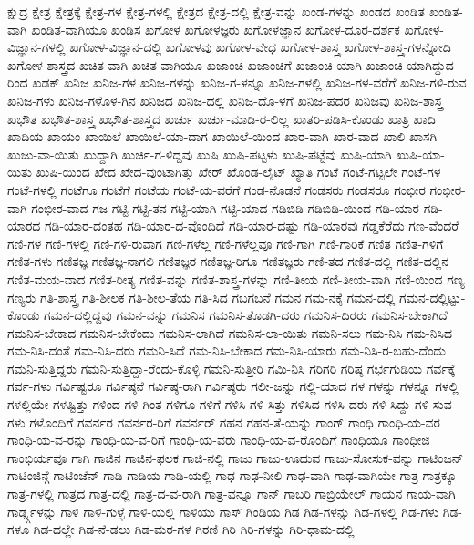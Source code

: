 {ಕ್ಷುದ್ರ
ಕ್ಷೇತ್ರ
ಕ್ಷೇತ್ರಕ್ಕೆ
ಕ್ಷೇತ್ರ-ಗಳ
ಕ್ಷೇತ್ರ-ಗಳಲ್ಲಿ
ಕ್ಷೇತ್ರದ
ಕ್ಷೇತ್ರ-ದಲ್ಲಿ
ಕ್ಷೇತ್ರ-ವನ್ನು
ಖಂಡ-ಗಳನ್ನು
ಖಂಡದ
ಖಂಡಿತ
ಖಂಡಿತ-ವಾಗಿ
ಖಂಡಿತ-ವಾಗಿಯೂ
ಖಂಡಿಸ
ಖಗೋಳ
ಖಗೋಳಜ್ಞರು
ಖಗೋಳಜ್ಞಾನ
ಖಗೋಳ-ದೂರ-ದರ್ಶಕ
ಖಗೋಳ-ವಿಜ್ಞಾನ-ಗಳಲ್ಲಿ
ಖಗೋಳ-ವಿಜ್ಞಾನ-ದಲ್ಲಿ
ಖಗೋಳವು
ಖಗೋಳ-ವೇಧ
ಖಗೋಳ-ಶಾಸ್ತ್ರ
ಖಗೋಳ-ಶಾಸ್ತ್ರ-ಗಳನ್ನೋದಿ
ಖಗೋಳ-ಶಾಸ್ತ್ರದ
ಖಚಿತ-ವಾಗಿ
ಖಚಿತ-ವಾಗಿಯೂ
ಖಜಾಂಚಿ
ಖಜಾಂಚಿಗೆ
ಖಜಾಂಚಿ-ಯಾಗಿ
ಖಜಾಂಚಿ-ಯಾಗಿದ್ದುದ-ರಿಂದ
ಖಡಕ್
ಖನಿಜ
ಖನಿಜ-ಗಳ
ಖನಿಜ-ಗಳನ್ನು
ಖನಿಜ-ಗ-ಳನ್ನೂ
ಖನಿಜ-ಗಳಲ್ಲಿ
ಖನಿಜ-ಗಳ-ವರೆಗೆ
ಖನಿಜ-ಗಳಿ-ರುವ
ಖನಿಜ-ಗಳು
ಖನಿಜ-ಗಳೊಳ-ಗಿನ
ಖನಿಜದ
ಖನಿಜ-ದಲ್ಲಿ
ಖನಿಜ-ದೊ-ಳಗೆ
ಖನಿಜ-ಪದರ
ಖನಿಜವು
ಖನಿಜ-ಶಾಸ್ತ್ರ
ಖಭೌತ
ಖಭೌತ-ಶಾಸ್ತ್ರ
ಖಭೌತ-ಶಾಸ್ತ್ರದ
ಖರ್ಚು
ಖರ್ಚು-ಮಾಡಿ-ರ-ಲಿಲ್ಲ
ಖಾತರಿ-ಪಡಿಸಿ-ಕೊಂಡು
ಖಾತ್ರಿ
ಖಾದಿ
ಖಾದಿಯ
ಖಾಯಂ
ಖಾಯಿಲೆ
ಖಾಯಿಲೆ-ಯಾ-ದಾಗ
ಖಾಯಿಲೆ-ಯಿಂದ
ಖಾರ-ವಾಗಿ
ಖಾರ-ವಾದ
ಖಾಲಿ
ಖಾಸಗಿ
ಖುಜು-ವಾ-ಯಿತು
ಖುದ್ದಾಗಿ
ಖುರ್ಚಿ-ಗ-ಳಿದ್ದವು
ಖುಷಿ
ಖುಷಿ-ಪಟ್ಟಳು
ಖುಷಿ-ಪಟ್ಟೆವು
ಖುಷಿ-ಯಾಗಿ
ಖುಷಿ-ಯಾ-ಯಿತು
ಖುಷಿ-ಯಿಂದ
ಖೇದ
ಖೇದ-ವುಂಟಾಗಿತ್ತು
ಖೇರ್
ಖೊಂಡ-ಲೈಟ್
ಖ್ಯಾತಿ
ಗಂಟೆ
ಗಂಟೆ-ಗಟ್ಟಲೇ
ಗಂಟೆ-ಗಳ
ಗಂಟೆ-ಗಳಲ್ಲಿ
ಗಂಟೆಗೂ
ಗಂಟೆಗೆ
ಗಂಟೆಯ
ಗಂಟೆ-ಯ-ವರೆಗೆ
ಗಂಡ-ನೊಡನೆ
ಗಂಡಸರು
ಗಂಡಸರೂ
ಗಂಭೀರ
ಗಂಭೀರ-ವಾಗಿ
ಗಂಭೀರ-ವಾದ
ಗಜ
ಗಟ್ಟಿ
ಗಟ್ಟಿ-ತನ
ಗಟ್ಟಿ-ಯಾಗಿ
ಗಟ್ಟಿ-ಯಾದ
ಗಡಿಬಿಡಿ
ಗಡಿಬಿಡಿ-ಯಿಂದ
ಗಡಿ-ಯಾರ
ಗಡಿ-ಯಾರದ
ಗಡಿ-ಯಾರ-ದಂತಹ
ಗಡಿ-ಯಾರ-ದ-ವೊಂದಿದೆ
ಗಡಿ-ಯಾರ-ದಷ್ಟು
ಗಡಿ-ಯಾರವು
ಗಡ್ಡಕೆರೆದು
ಗಣ-ವೆಂದರೆ
ಗಣಿ-ಗಳ
ಗಣಿ-ಗಳಲ್ಲಿ
ಗಣಿ-ಗಳಿ-ರುವಾಗ
ಗಣಿ-ಗಳೆಲ್ಲ
ಗಣಿ-ಗಳೆಲ್ಲವೂ
ಗಣಿ-ಗಾಗಿ
ಗಣಿ-ಗಾರಿಕೆ
ಗಣಿತ
ಗಣಿತ-ಗಳಿಗೆ
ಗಣಿತ-ಗಳು
ಗಣಿತಜ್ಞ
ಗಣಿತಜ್ಞ-ನಾಗಲಿ
ಗಣಿತಜ್ಞರ
ಗಣಿತಜ್ಞ-ರಿಗೂ
ಗಣಿತಜ್ಞರು
ಗಣಿ-ತದ
ಗಣಿತ-ದಲ್ಲಿ
ಗಣಿತ-ದಲ್ಲಿನ
ಗಣಿತ-ಮಯ-ವಾದ
ಗಣಿತ-ರೀತ್ಯ
ಗಣಿತ-ವನ್ನು
ಗಣಿತ-ಶಾಸ್ತ್ರ-ಗಳನ್ನು
ಗಣಿ-ತೀಯ
ಗಣಿ-ತೀಯ-ವಾಗಿ
ಗಣಿ-ಯಿಂದ
ಗಣ್ಯ
ಗಣ್ಯರು
ಗತಿ-ಶಾಸ್ತ್ರ
ಗತಿ-ಶೀಲಕ
ಗತಿ-ಶೀಲ-ತೆಯ
ಗತಿ-ಸಿದ
ಗಬಗಬನೆ
ಗಮನ
ಗಮ-ನಕ್ಕೆ
ಗಮನ-ದಲ್ಲಿ
ಗಮನ-ದಲ್ಲಿಟ್ಟು-ಕೊಂಡು
ಗಮನ-ದಲ್ಲಿದ್ದವು
ಗಮನ-ವನ್ನು
ಗಮನಿಸ
ಗಮನಿಸ-ತೊಡಗಿ-ದರು
ಗಮನಿಸ-ದಿರರು
ಗಮನಿಸ-ಬೇಕಾಗಿದೆ
ಗಮನಿಸ-ಬೇಕಾದ
ಗಮನಿಸ-ಬೇಕೆಂದು
ಗಮನಿಸ-ಲಾಗಿದೆ
ಗಮನಿಸ-ಲಾ-ಯಿತು
ಗಮನಿ-ಸಲು
ಗಮ-ನಿಸಿ
ಗಮ-ನಿಸಿದ
ಗಮ-ನಿಸಿ-ದಂತೆ
ಗಮ-ನಿಸಿ-ದರು
ಗಮನಿ-ಸಿದೆ
ಗಮ-ನಿಸಿ-ಬೇಕಾದ
ಗಮ-ನಿಸಿ-ಯಾರು
ಗಮ-ನಿಸಿ-ರ-ಬಹು-ದೆಂದು
ಗಮನಿ-ಸುತ್ತಿದ್ದರು
ಗಮನಿ-ಸುತ್ತಿದ್ದಾ-ರೆಂದು-ಕೊಳ್ಳಿ
ಗಮನಿ-ಸುತ್ತೀರಿ
ಗಮಿ-ನಿಸಿ
ಗರಿಗರಿ
ಗರಿಷ್ಠ
ಗರ್ಭಗುಡಿಯ
ಗರ್ವಕ್ಕೆ
ಗರ್ವ-ಗಳು
ಗರ್ವಿಷ್ಟರೂ
ಗರ್ವಿಷ್ಠನೆ
ಗರ್ವಿಷ್ಠ-ರಾಗಿ
ಗರ್ವಿಷ್ಠರು
ಗಲೀ-ಜನ್ನು
ಗಲ್ಲಿ-ಯಾದ
ಗಳ
ಗಳನ್ನು
ಗಳನ್ನೂ
ಗಳಲ್ಲಿ
ಗಳಲ್ಲಿಯೇ
ಗಳಷ್ಟಿತ್ತು
ಗಳಿಂದ
ಗಳಿ-ಗಿಂತ
ಗಳಿಗೂ
ಗಳಿಗೆ
ಗಳಿಸಿ
ಗಳಿ-ಸಿತ್ತು
ಗಳಿಸಿದ
ಗಳಿಸಿ-ದರು
ಗಳಿ-ಸಿದ್ದು
ಗಳಿ-ಸುವ
ಗಳು
ಗಳೊಂದಿಗೆ
ಗವರ್ನರ
ಗವರ್ನರ-ರಿಗೆ
ಗವರ್ನರ್
ಗಹನ
ಗಹನ-ತೆ-ಯನ್ನು
ಗಾಂಗ್
ಗಾಂಧಿ
ಗಾಂಧಿ-ಯ-ವರ
ಗಾಂಧಿ-ಯ-ವ-ರನ್ನು
ಗಾಂಧಿ-ಯ-ವ-ರಿಗೆ
ಗಾಂಧಿ-ಯ-ವರು
ಗಾಂಧಿ-ಯ-ವ-ರೊಂದಿಗೆ
ಗಾಂಧಿಯೂ
ಗಾಂಧೀಜಿ
ಗಾಂಭಿರ್ಯವೂ
ಗಾಗಿ
ಗಾಜಿನ
ಗಾಜಿನ-ಫಲಕ
ಗಾಜಿ-ನಲ್ಲಿ
ಗಾಜು
ಗಾಜು-ಊದುವ
ಗಾಜು-ಸೋಸುಕ-ವನ್ನು
ಗಾಟಿಂಜನ್
ಗಾಟಿಂಜಿನ್ಗೆ
ಗಾಟಿಂಜೆನ್
ಗಾಡಿ
ಗಾಡಿಯ
ಗಾಡಿ-ಯಲ್ಲಿ
ಗಾಢ
ಗಾಢ-ನೀಲಿ
ಗಾಢ-ವಾಗಿ
ಗಾಢ-ವಾಗಿಯೇ
ಗಾತ್ರ
ಗಾತ್ರಕ್ಕೂ
ಗಾತ್ರ-ಗಳಲ್ಲಿ
ಗಾತ್ರದ
ಗಾತ್ರ-ದಲ್ಲಿ
ಗಾತ್ರ-ದ-ವ-ರಾಗಿ
ಗಾತ್ರ-ವನ್ನೂ
ಗಾನ್
ಗಾಬರಿ
ಗಾಬ್ರಿಯೇಲ್
ಗಾಯನ
ಗಾಯ-ವಾಗಿ
ಗಾರ್ಡ್ನ್ಗಳನ್ನು
ಗಾಳಿ
ಗಾಳಿ-ಗುಳ್ಳೆ
ಗಾಳಿ-ಯಲ್ಲಿ
ಗಾಳಿಯು
ಗಾಸ್
ಗಿಂಡಿಯ
ಗಿಡ
ಗಿಡ-ಗಳನ್ನು
ಗಿಡ-ಗಳಲ್ಲಿ
ಗಿಡ-ಗಳು
ಗಿಡ-ಗಳೂ
ಗಿಡ-ದಲ್ಲೇ
ಗಿಡ-ನೆ-ಡಲು
ಗಿಡ-ಮರ-ಗಳ
ಗಿರಣಿ
ಗಿರಿ
ಗಿರಿ-ಗಳನ್ನು
ಗಿರಿ-ಧಾಮ-ದಲ್ಲಿ
}
